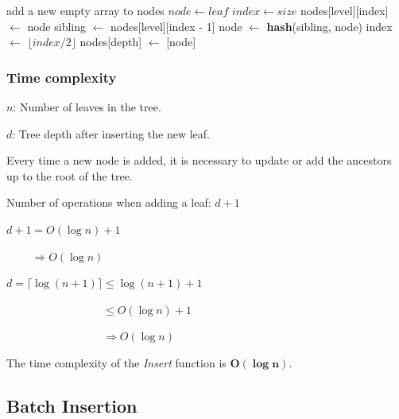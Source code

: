 \documentclass{article}
\begin{document}
\begin{algorithm}[H]
    \caption{LeanIMT Insert algorithm}\label{insert}
    \begin{algorithmic}[1]
         
        \State add a new empty array to nodes 
        \EndIf
        \State $node\gets leaf$
        \State $index\gets size$ 
        \State nodes[level][index] $\gets$ node
         
        \State sibling $\gets$ nodes[level][index - 1]
        \State node $\gets$ \textbf{hash}(sibling, node)
        \EndIf
        \State index $\gets$ $\lfloor index/2 \rfloor$ 
        \EndFor
        \State nodes[depth] $\gets$ [node] 
        \EndProcedure
    \end{algorithmic}
\end{algorithm}


\subsubsection{Time complexity}

$n$: Number of leaves in the tree.

$d$: Tree depth after inserting the new leaf.

Every time a new node is added, it is necessary to update or add the ancestors up to the root of the tree.

Number of operations when adding a leaf: $d + 1$

$d + 1 = O(\log n) + 1$

$\phantom{d + 1} \Rightarrow \boxed{O(\log n)}$

$d = \lceil \log (n+1) \rceil \leq \log (n+1) + 1$

$\phantom{d = \lceil \log (n+1) \rceil} \leq O(\log n) + 1$

$\phantom{d = \lceil \log (n+1) \rceil} \Rightarrow O(\log n)$

The time complexity of the \textit{Insert} function is $\boldsymbol{O(\log n)}$.


\subsection{Batch Insertion}
\end{document}
